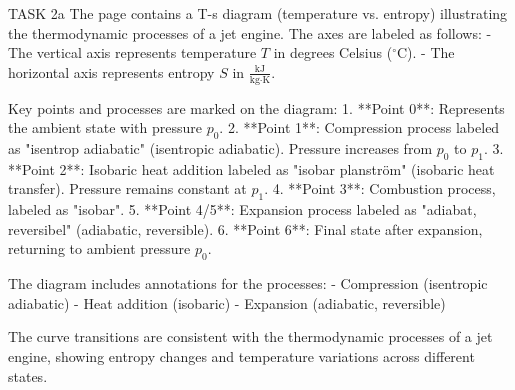TASK 2a  
The page contains a T-s diagram (temperature vs. entropy) illustrating the thermodynamic processes of a jet engine. The axes are labeled as follows:  
- The vertical axis represents temperature \( T \) in degrees Celsius (\( ^\circ \text{C} \)).  
- The horizontal axis represents entropy \( S \) in \( \frac{\text{kJ}}{\text{kg·K}} \).  

Key points and processes are marked on the diagram:  
1. **Point 0**: Represents the ambient state with pressure \( p_0 \).  
2. **Point 1**: Compression process labeled as "isentrop adiabatic" (isentropic adiabatic). Pressure increases from \( p_0 \) to \( p_1 \).  
3. **Point 2**: Isobaric heat addition labeled as "isobar planström" (isobaric heat transfer). Pressure remains constant at \( p_1 \).  
4. **Point 3**: Combustion process, labeled as "isobar".  
5. **Point 4/5**: Expansion process labeled as "adiabat, reversibel" (adiabatic, reversible).  
6. **Point 6**: Final state after expansion, returning to ambient pressure \( p_0 \).  

The diagram includes annotations for the processes:  
- Compression (isentropic adiabatic)  
- Heat addition (isobaric)  
- Expansion (adiabatic, reversible)  

The curve transitions are consistent with the thermodynamic processes of a jet engine, showing entropy changes and temperature variations across different states.